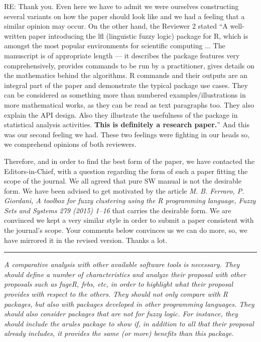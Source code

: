 \documentclass{article}
\newcommand{\separator}{\rule{\textwidth}{0.4pt}}
\begin{document}
{RE: Thank you. Even here we have to admit we were ourselves constructing several variants on how the paper should look like and we had a feeling that a similar opinion may occur. On the other hand, the Reviewer 2 stated ``A well-written paper introducing the lfl (linguistic fuzzy logic) package for R, which is amongst the most popular environments for scientific computing $\ldots$ The manuscript is of appropriate length — it describes the package features very comprehensively, provides commands to be run by a practitioner, gives details on the mathematics behind the algorithms. R commands and their outputs are an integral part of the paper and demonstrate the typical package use cases. They can be considered as something more than numbered examples/illustrations in more mathematical works, as they can be read as text paragraphs too. They also explain the API design.
Also they illustrate the usefulness of the package in statistical analysis activities. {\bf This is definitely a research paper.}'' And this was our second feeling we had. These two feelings were fighting in our heads so, we comprehend opinions of both reviewers. 

Therefore, and in order to find the best form of the paper, we have contacted the Editors-in-Chief, with a question regarding the form of such a paper fitting the scope of the journal. We all agreed that pure SW manual is not the desirable form. We have been advised to get motivated by the article {\it M. B. Ferraro, P. Giordani, A toolbox for fuzzy clustering using the R programming language, Fuzzy Sets and Systems 279 (2015) 1–16} that carries the desirable form. We are convinced we kept a very similar style in order to submit a paper consistent with the journal's scope. Your comments below convinces us we can do more, so, we have mirrored it in the revised version. Thanks a lot.}

\separator

{\it A comparative analysis with other available software tools is necessary. They should define a number of characteristics and analyze their proposal with other proposals such as fugeR, frbs, etc, in order to highlight what their proposal provides with respect to the others. They should not only compare with R packages, but also with packages developed in other programming languages. They should also consider packages that are not for fuzzy logic. For instance, they should include the arules package to show if, in addition to all that their proposal already includes, it provides the same (or more) benefits than this package. }
\end{document}
